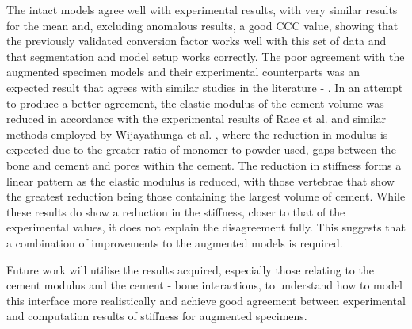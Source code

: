 The intact models agree well with experimental results, with very similar results for the mean and, excluding anomalous results, a good CCC value,  showing that the previously validated conversion factor works well with this set of data and that segmentation and model setup works correctly. The poor agreement with the augmented specimen models and their experimental counterparts was an expected result that agrees with similar studies in the literature - \cite{Wijayathunga2008}. In an attempt to
produce a better agreement, the elastic modulus of the cement volume was reduced in accordance with the experimental results of Race et al. \cite{Race2007} and similar methods employed by Wijayathunga et al. \cite{Wijayathunga2008}, where the reduction in modulus is expected due to the greater ratio of monomer to powder used, gaps between the bone and cement and pores within the cement. The reduction in stiffness forms a linear pattern as the elastic modulus is reduced, with those vertebrae that
show the greatest reduction being those containing the largest volume of cement. While these results do show a reduction in the stiffness, closer to that of the experimental values, it does not explain the disagreement fully. This suggests that a combination of improvements to the augmented models is required.

Future work will utilise the results acquired, especially those relating to the cement modulus and the cement - bone interactions, to understand how to model this interface more realistically and achieve good agreement between experimental and computation results of stiffness for augmented specimens.


